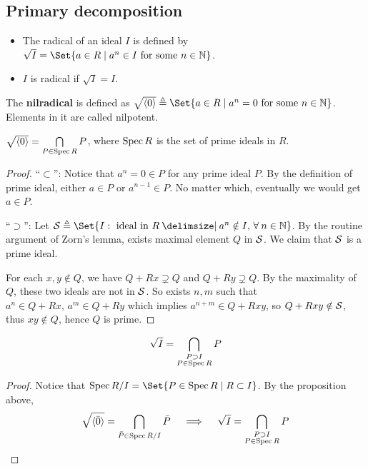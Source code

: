 \subsection{Primary decomposition}
\begin{definition} \hfill
  \begin{itemize}
    \item The radical of an ideal $I$ is defined by $\sqrt{I} =
      \Set{ a \in R \mid a^n \in I \text{ for some } n \in \Nb}$.
    \item $I$ is radical if $\sqrt{I} = I$.
  \end{itemize}
\end{definition}

\begin{definition}
  The {\bf nilradical} is defined as $\sqrt{\gen{0}} \triangleq
  \Set{ a \in R \mid a^n = 0 \text{ for some } n \in \Nb}$.
  Elements in it are called nilpotent.
\end{definition}

\begin{prop}
  $\sqrt{ \langle0\rangle } = \bigcap\limits_{P \in \operatorname{Spec} R} P$, where $\operatorname{Spec} R$ is the
  set of prime ideals in $R$.

  \begin{proof}
    ``$\subset$'': Notice that $a^n = 0 \in P$ for any prime ideal $P$. By the definition of
    prime ideal, either $a \in P$ or $a^{n-1} \in P$. No matter which, eventually we would get
    $a \in P$.

    ``$\supset$'':
    Let $\Sc \triangleq \Set{ I : \text{ ideal in } R \given a^n \notin I, \, \forall n \in \Nb}$.
    By the routine argument of Zorn's lemma, exists maximal element $Q$ in $\mathcal{S}$.
    We claim that $\mathcal{S}$ is a prime ideal.

    For each $x, y \notin Q$, we have $Q + Rx \supsetneq Q$ and $Q + Ry \supsetneq Q$.
    By the maximality of $Q$, these two ideals are not in $\mathcal{S}$.
    So exists $n, m$ such that $a^n \in Q + Rx,\, a^m \in Q + Ry$ which implies
    $a^{n+m} \in Q + Rxy$, so $Q + Rxy \notin \mathcal{S}$, thus $xy \notin Q$,
    hence $Q$ is prime.
  \end{proof}
\end{prop}

\begin{coro} \label{coro:equation-of-sqrt-ideal}
  \[ \sqrt{I} = \bigcap_{\substack{P \supset I \\ P \in \operatorname{Spec} R}} P \]

  \begin{proof}
    Notice that $\Spec \quot{R}{I} = \Set{P \in \Spec R \mid R \subset I}$.
    By the proposition above,
    \[
      \sqrt{\langle \bar0 \rangle} = \bigcap_{\bar{P} \in \operatorname{Spec} {R}/{I}} \bar{P}
      \quad \implies \quad \sqrt{I} = \bigcap_{\substack{P \supset I \\ P \in \operatorname{Spec} R}} P
      \qedhere
    \]
    \end{proof}
\end{coro}

